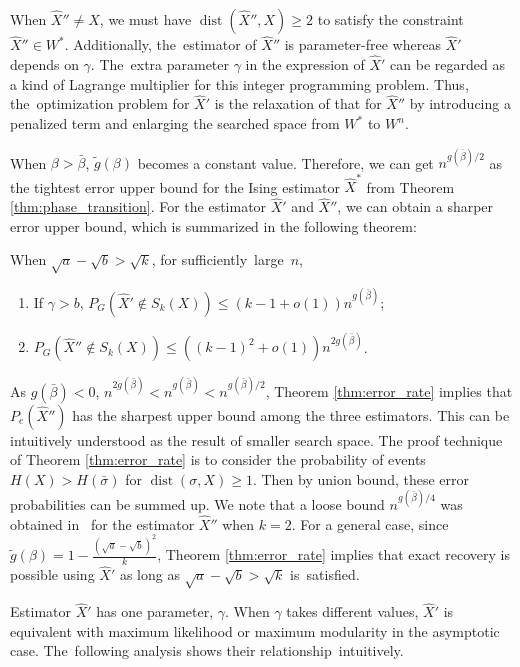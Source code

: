 \documentclass[entropy,article,accept,moreauthors,pdftex]{Definitions/mdpi}
\newcommand{\1}{\mathbbm{1}}
\DeclareMathOperator{\Dist}{dist}
\begin{document}
\begin{paracol}{2}
When $\hat{X}'' \neq X$, we must have $\Dist(\hat{X}'' ,X)\geq 2$ to satisfy the constraint $\hat{X}'' \in W^*$.
Additionally, the~estimator of $\hat{X}''$ is parameter-free whereas $\hat{X}'$ depends on $\gamma$. The~extra parameter $\gamma$ in the expression of
$\hat{X}'$ can be regarded as a kind of Lagrange multiplier for this integer programming problem. Thus, the~optimization problem for $\hat{X}'$
is the relaxation of that for $\hat{X}''$ by introducing a penalized term and enlarging the searched space from $W^*$ to $W^n$.

When $\beta > \bar{\beta}$, $\tilde{g}(\beta)$ becomes a constant value. Therefore, we can get $n^{g(\bar{\beta})/2}$ as the tightest error upper bound for the Ising estimator $\hat{X}^*$ from Theorem \ref{thm:phase_transition}.
For the estimator $\hat{X}'$ and $\hat{X}''$, we can obtain a sharper error upper bound, which is
summarized in the following theorem:
\begin{Theorem}\label{thm:error_rate}
When $\sqrt{a} - \sqrt{b} > \sqrt{k}$, for sufficiently~large~$n$, 
\begin{enumerate}
	\item If $\gamma > b$, $P_G(\hat{X}' \not\in S_k(X)) \leq (k-1+o(1))n^{g(\bar{\beta})}$;
	\item $P_G(\hat{X}'' \not\in S_k(X)) \leq ((k-1)^2+o(1))n^{2g(\bar{\beta})}$.
\end{enumerate}
\end{Theorem}
As $g(\bar{\beta})<0$, $n^{2g(\bar{\beta})} < n^{g(\bar{\beta})} < n^{g(\bar{\beta})/2}$,
Theorem \ref{thm:error_rate} implies that $P_e(\hat{X}'')$ has the sharpest upper bound among the three estimators.
This can be intuitively understood as the result of smaller search space.
The proof technique of Theorem \ref{thm:error_rate} is to consider the probability of events $H(X) > H(\bar{\sigma})$
for $\Dist(\sigma, X) \geq 1$. Then by union bound, these error probabilities can be summed up.
We note that a loose bound $n^{g(\bar{\beta})/4}$ was obtained in~\cite{abbe2015exact} for the estimator $\hat{X}''$ when $k=2$.
For a general case, since $\tilde{g}(\beta) = 1- \frac{(\sqrt{a} - \sqrt{b})^2}{k}$, Theorem \ref{thm:error_rate} implies that exact recovery is possible using $\hat{X}'$ as long as  
$\sqrt{a} - \sqrt{b} > \sqrt{k}$ is~satisfied.


Estimator $\hat{X}'$ has one parameter, $\gamma$. When $\gamma$ takes different values, $\hat{X}'$
is equivalent with maximum likelihood or maximum modularity in the asymptotic case. The~following analysis shows
their relationship~intuitively.


\end{paracol}
\end{document}
